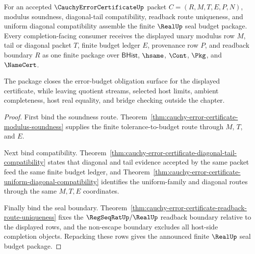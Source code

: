 \begin{theorem}
\label{thm:cauchy-error-certificate-seal-budget-package}
For an accepted $\CauchyErrorCertificateUp$ packet $C=(R,M,T,E,P,N)$, modulus soundness, diagonal-tail compatibility, readback route uniqueness, and uniform diagonal compatibility assemble the finite $\RealUp$ seal budget package. Every completion-facing consumer receives the displayed unary modulus row $M$, tail or diagonal packet $T$, finite budget ledger $E$, provenance row $P$, and readback boundary $R$ as one finite package over $\mathsf{BHist}$, $\hsame$, $\Cont$, $\Pkg$, and $\NameCert$.

The package closes the error-budget obligation surface for the displayed certificate, while leaving quotient streams, selected host limits, ambient completeness, host real equality, and bridge checking outside the chapter.
\end{theorem}
\begin{proof}
First bind the soundness route. Theorem~\ref{thm:cauchy-error-certificate-modulus-soundness} supplies the finite tolerance-to-budget route through $M$, $T$, and $E$.

Next bind compatibility. Theorem~\ref{thm:cauchy-error-certificate-diagonal-tail-compatibility} states that diagonal and tail evidence accepted by the same packet feed the same finite budget ledger, and Theorem~\ref{thm:cauchy-error-certificate-uniform-diagonal-compatibility} identifies the uniform-family and diagonal routes through the same $M,T,E$ coordinates.

Finally bind the seal boundary. Theorem~\ref{thm:cauchy-error-certificate-readback-route-uniqueness} fixes the $\RegSeqRatUp/\RealUp$ readback boundary relative to the displayed rows, and the non-escape boundary excludes all host-side completion objects. Repacking these rows gives the announced finite $\RealUp$ seal budget package.
\end{proof}

